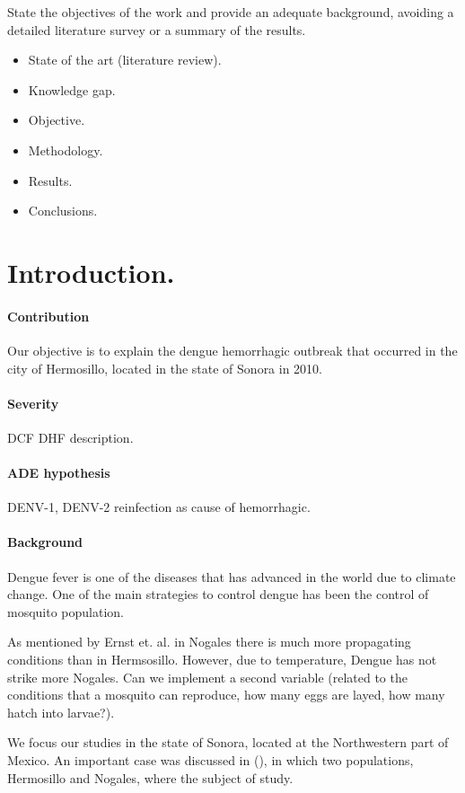 State the objectives of the work and provide an adequate 
background, avoiding a detailed literature survey or a 
summary of the results.
\begin{itemize}
	\item
    	State of the art (literature review).
    \item	
    	Knowledge gap.
    \item	
    	Objective.
    \item
    	Methodology.
    \item	
    	Results.
    \item
    	Conclusions.
\end{itemize}

\section{Introduction.}\label{intro}
\paragraph{Contribution}
Our objective is to explain the dengue hemorrhagic outbreak that 
occurred in the city of Hermosillo, located in the state of Sonora in 2010.
\paragraph{Severity}
\ac{DCF} 
\ac{DHF} description.
\paragraph{ADE hypothesis}
\ac{DENV-1}, \ac{DENV-2}
reinfection as cause of hemorrhagic.
\paragraph{Background}

	Dengue fever is one of the diseases that has advanced in the 
world due to climate change. One of the main strategies to control dengue has been the control of mosquito population.

	As mentioned by Ernst et. al. \citet{Ernst2016} in Nogales there 
is much more propagating conditions than in Hermsosillo. However, 
due to temperature, Dengue has not strike more Nogales. Can we 
implement a second variable (related to the conditions that a 
mosquito can reproduce, how many eggs are layed, how many hatch into larvae?).

\noindent We focus our studies in the state of Sonora, located at the Northwestern part of Mexico. An important case was discussed in (\cite{Ernst2016}), in which two populations, Hermosillo and Nogales, where the subject of study.

